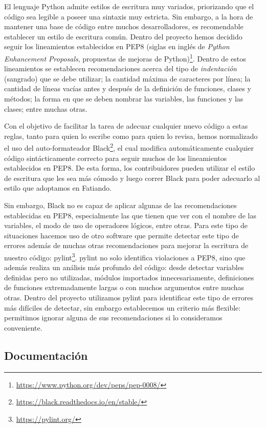 El lenguaje Python admite estilos de escritura muy variados, priorizando que el
código sea legible a poseer una sintaxis muy estricta.
Sin embargo, a la hora de mantener una base de código entre muchos
desarrolladores, es recomendable establecer un estilo de escritura común.
Dentro del proyecto hemos decidido seguir los lineamientos establecidos en
PEP8 (siglas en inglés de \emph{Python Enhancement Proposals}, propuestas de
mejoras de Python)\footnote{\url{https://www.python.org/dev/peps/pep-0008/}}.
Dentro de estos lineamientos se establecen recomendaciones acerca del tipo de
\emph{indentación} (sangrado) que se debe utilizar; la cantidad máxima de
caracteres por línea; la cantidad de líneas vacías antes y después de la
definición de funciones, clases y métodos; la forma en que se deben nombrar las
variables, las funciones y las clases; entre muchas otras.

Con el objetivo de facilitar la tarea de adecuar cualquier nuevo código a estas
reglas, tanto para quien lo escribe como para quien lo revisa, hemos
normalizado el uso del auto-formateador
Black\footnote{\url{https://black.readthedocs.io/en/stable/}}, el cual
modifica automáticamente cualquier código sintácticamente correcto para seguir
muchos de los lineamientos establecidos en PEP8.
De esta forma, los contribuidores pueden utilizar el estilo de escritura que
les sea más cómodo y luego correr Black para poder adecuarlo al estilo que
adoptamos en Fatiando.

Sin embargo, Black no es capaz de aplicar algunas de las recomendaciones
establecidas en PEP8, especialmente las que tienen que ver con el nombre de las
variables, el modo de uso de operadores lógicos, entre otras.
Para este tipo de situaciones hacemos uso de otro software que permite detectar
este tipo de errores además de muchas otras recomendaciones para mejorar la
escritura de nuestro código: pylint\footnote{\url{https://pylint.org/}}.
pylint no solo identifica violaciones a PEP8, sino que además realiza un
análisis más profundo del código: desde detectar variables definidas pero no
utilizadas, módulos importados innecesariamente, definiciones de funciones
extremadamente largas o con muchos argumentos entre muchas otras.
Dentro del proyecto utilizamos pylint para identificar este tipo de errores más
difíciles de detectar, sin embargo establecemos un criterio más flexible:
permitimos ignorar alguna de sus recomendaciones si lo consideramos
conveniente.

\subsection{Documentación}

